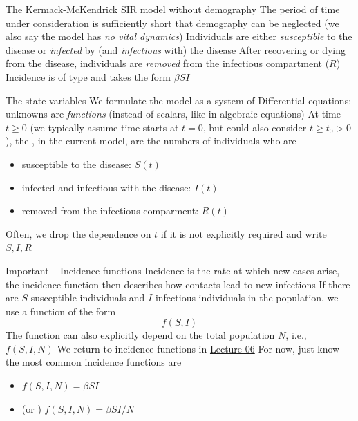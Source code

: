 \documentclass[aspectratio=169]{beamer}\usepackage[]{graphicx}\usepackage[]{xcolor}
\begin{document}
\begin{frame}{The Kermack-McKendrick SIR model without demography}
\bbullet The period of time under consideration is sufficiently short that demography can be neglected (we also say the model has \emph{no vital dynamics})
\vfill
\bbullet Individuals are either \emph{susceptible} to the disease or \emph{infected} by (and \emph{infectious} with) the disease
\vfill
\bbullet After recovering or dying from the disease, individuals are \emph{removed} from the infectious compartment ($R$)
\vfill
\bbullet Incidence is of  type and takes the form $\beta SI$
\end{frame}


\begin{frame}{The state variables}
We formulate the model as a system of 
\vfill
Differential equations: unknowns are \emph{functions} (instead of scalars, like in algebraic equations)
\vfill
At time $t\geq 0$ (we typically assume time starts at $t=0$, but could also consider $t\geq t_0>0$), the , in the current model, are the numbers of individuals who are
\begin{itemize}
\item susceptible to the disease: $S(t)$
\item infected and infectious with the disease: $I(t)$
\item removed from the infectious comparment: $R(t)$
\end{itemize}
\vfill
Often, we drop the dependence on $t$ if it is not explicitly required and write $S,I,R$
\end{frame}



\begin{frame}{Important -- Incidence functions}
Incidence is the rate at which new cases arise, the incidence function then describes how contacts lead to new infections
\vfill
If there are $S$ susceptible individuals and $I$ infectious individuals in the population, we use a function of the form
\[
f(S,I)
\]
The function can also explicitly depend on the total population $N$, i.e., $f(S,I,N)$
\vfill
We return to incidence functions in \href{no.se}{Lecture 06}
\vfill
For now, just know the most common incidence functions are
\begin{itemize}
\item {} $f(S,I,N)=\beta SI$
\item {} (or )  $f(S,I,N)=\beta SI/N$
\end{itemize}
\end{frame}
\end{document}
